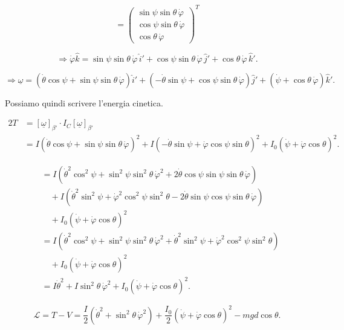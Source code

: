 \[
=
\begin{pmatrix}
\sin\psi\sin\theta\,\dot{\varphi}\\
\cos\psi\sin\theta\,\dot{\varphi}\\
\cos\theta\,\dot{\varphi}
\end{pmatrix}^{T}
\]

\[
\Rightarrow
\dot{\varphi}\hat{k}
=
\sin\psi\sin\theta\,\dot{\varphi}\,\hat{i}'
+
\cos\psi\sin\theta\,\dot{\varphi}\,\hat{j}'
+
\cos\theta\,\dot{\varphi}\,\hat{k}'.
\]

\[
\Rightarrow
\underline{\omega}
=
\left(
\dot{\theta}\cos\psi
+
\sin\psi\sin\theta\,\dot{\varphi}
\right)\hat{i}'
+
\left(
-\dot{\theta}\sin\psi
+
\cos\psi\sin\theta\,\dot{\varphi}
\right)\hat{j}'
+
\left(
\dot{\psi}
+
\cos\theta\,\dot{\varphi}
\right)\hat{k}'.
\]

Possiamo quindi scrivere l'energia cinetica.

\[
\begin{aligned}
2T
&=
[\underline{\omega}]_{\beta'}\cdot I_C[\underline{\omega}]_{\beta'}\\
&=
I\left(
\dot{\theta}\cos\psi
+
\sin\psi\sin\theta\,\dot{\varphi}
\right)^2
+
I\left(
-\dot{\theta}\sin\psi
+
\dot{\varphi}\cos\psi\sin\theta
\right)^2
+
I_0
\left(
\dot{\psi}
+
\dot{\varphi}\cos\theta
\right)^2.
\end{aligned}
\]

\[
\begin{aligned}
&=
I\left(
\dot{\theta}^2\cos^2\psi
+
\sin^2\psi\sin^2\theta\,\dot{\varphi}^2
+
2\dot{\theta}\cos\psi\sin\psi\sin\theta\,\dot{\varphi}
\right)\\
&\quad+
I\left(
\dot{\theta}^2\sin^2\psi
+
\dot{\varphi}^2\cos^2\psi\sin^2\theta
-
2\dot{\theta}\sin\psi\cos\psi\sin\theta\,\dot{\varphi}
\right)\\
&\quad+
I_0
\left(
\dot{\psi}
+
\dot{\varphi}\cos\theta
\right)^2\\
&=
I\left(
\dot{\theta}^2\cos^2\psi
+
\sin^2\psi\sin^2\theta\,\dot{\varphi}^2
+
\dot{\theta}^2\sin^2\psi
+
\dot{\varphi}^2\cos^2\psi\sin^2\theta
\right)\\
&\quad+
I_0
\left(
\dot{\psi}
+
\dot{\varphi}\cos\theta
\right)^2\\
&=
I\dot{\theta}^2
+
I\sin^2\theta\,\dot{\varphi}^2
+
I_0
\left(
\dot{\psi}
+
\dot{\varphi}\cos\theta
\right)^2.
\end{aligned}
\]

\[
\mathcal{L}
=
T-V
=
\frac{I}{2}
\left(
\dot{\theta}^2
+
\sin^2\theta\,\dot{\varphi}^2
\right)
+
\frac{I_0}{2}
\left(
\dot{\psi}
+
\dot{\varphi}\cos\theta
\right)^2
-
mgd\cos\theta.
\]

